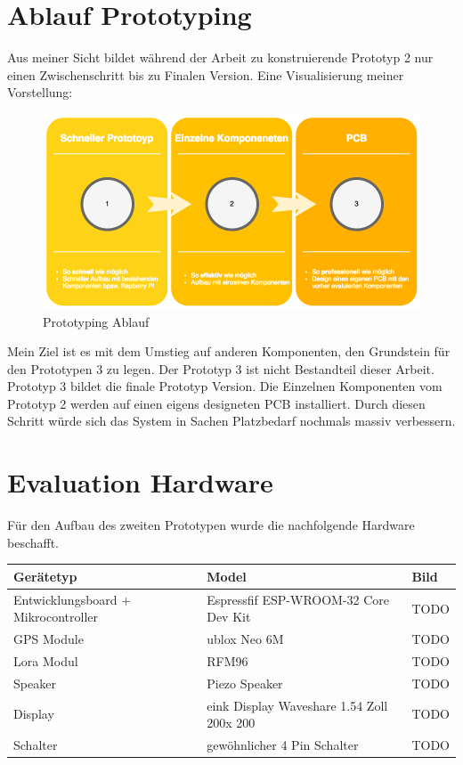 \documentclass[11pt,english,german]{report}
\theoremstyle{definition}
\begin{document}
\section{Ablauf Prototyping}
Aus meiner Sicht bildet während der Arbeit zu konstruierende Prototyp 2 nur einen Zwischenschritt bis zu Finalen Version. Eine Visualisierung meiner Vorstellung:\\
\begin{figure}[H]
	\centering
	\includegraphics[width=\textwidth]{img/projectFlow_Prototype.png}
	\caption[Prototyping Ablauf]
	{Prototyping Ablauf}
\end{figure}
\noindent
Mein Ziel ist es mit dem Umstieg auf anderen Komponenten, den Grundstein für den Prototypen 3 zu legen. Der Prototyp 3 ist nicht Bestandteil dieser Arbeit. Prototyp 3 bildet die finale Prototyp Version. Die Einzelnen Komponenten vom Prototyp 2 werden auf einen eigens designeten PCB installiert. Durch diesen Schritt würde sich das System in Sachen Platzbedarf nochmals massiv verbessern.


\newpage
\section{Evaluation Hardware}

Für den Aufbau des zweiten Prototypen wurde die nachfolgende Hardware beschafft. 

\begin{table}[htbp]
	\centering
	\begin{tabularx}{\textwidth}{lll}
		Gerätetyp & Model & Bild \\ \hline
		Entwicklungsboard + Mikrocontroller & Espressfif ESP-WROOM-32 Core Dev Kit  &TODO \\ \hline
		GPS Module& ublox Neo 6M & TODO \\ \hline
		Lora Modul & RFM96 & TODO \\ \hline
		Speaker & Piezo Speaker & TODO \\ \hline
		Display & eink Display Waveshare 1.54  Zoll 200x 200 & TODO \\ \hline
		Schalter & gewöhnlicher 4 Pin Schalter & TODO \\ \hline
	\end{tabularx}
\end{table}
\end{document}
